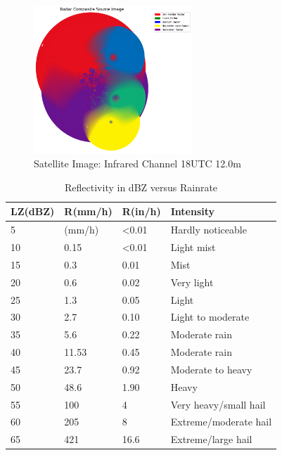 \documentclass[acmtog, authorversion]{acmart}
\begin{document}
\begin{figure}
    \centering
    \includegraphics[width=225]{report/images/radar_source.png}
    \caption{Satellite Image: Infrared Channel 18UTC 12.0\mu m}
    \label{fig:source}
\end{figure}


\begin{table}[h]
\caption{Reflectivity in dBZ versus Rainrate}
\begin{tabular}{@{}llll@{}}
\toprule
LZ(dBZ) & R(mm/h) & R(in/h)        & Intensity             \\ \midrule
5       & (mm/h)  & \textless 0.01 & Hardly noticeable     \\
10      & 0.15    & \textless 0.01 & Light mist            \\
15      & 0.3     & 0.01           & Mist                  \\
20      & 0.6     & 0.02           & Very light            \\
25      & 1.3     & 0.05           & Light                 \\
30      & 2.7     & 0.10           & Light to moderate     \\
35      & 5.6     & 0.22           & Moderate rain         \\
40      & 11.53   & 0.45           & Moderate rain         \\
45      & 23.7    & 0.92           & Moderate to heavy     \\
50      & 48.6    & 1.90           & Heavy                 \\
55      & 100     & 4              & Very heavy/small hail \\
60      & 205     & 8              & Extreme/moderate hail \\
65      & 421     & 16.6           & Extreme/large hail    \\ \bottomrule
\end{tabular}
\end{table}
\end{document}
